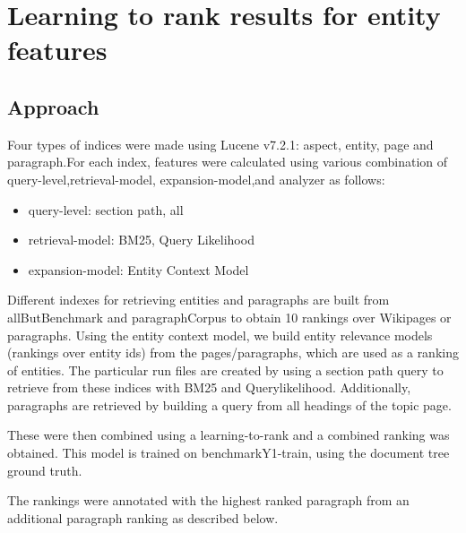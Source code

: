 \documentclass{article}
\begin{document}
\section{Learning to rank results for entity features}

\subsection{Approach}

Four types of indices were made using Lucene v7.2.1: aspect, entity, page and paragraph.For each index, features were calculated using various combination of query-level,retrieval-model, expansion-model,and analyzer as follows:
\begin{itemize}
   \item query-level: section path, all
    \item retrieval-model: BM25, Query Likelihood
    \item expansion-model: Entity Context Model
\end{itemize}
Different indexes for retrieving entities and paragraphs are built from allButBenchmark and paragraphCorpus to obtain 10 rankings over Wikipages or paragraphs. Using the entity context model, we build entity relevance models (rankings over entity ids) from the pages/paragraphs, which are used as a ranking of entities. The particular run files are created by using a section path query to retrieve from these indices with BM25 and Querylikelihood. Additionally, paragraphs are retrieved by building a query from all headings of the topic page.

These were then combined using a learning-to-rank and a combined ranking was obtained. 
This model is trained on benchmarkY1-train, using the document tree ground truth.



The rankings were annotated with the highest ranked paragraph from an additional paragraph ranking as described below.
\end{document}

